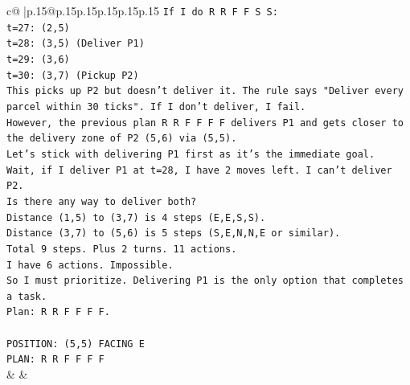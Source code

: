 \documentclass{article}
\begin{document}
{\begin{supertabular}{c@{$\;$}|p{.15\linewidth}@{}p{.15\linewidth}p{.15\linewidth}p{.15\linewidth}p{.15\linewidth}p{.15\linewidth}}
{{{\texttt{If I do R R F F S S:} \\
\texttt{t=27: (2,5)} \\
\texttt{t=28: (3,5) (Deliver P1)} \\
\texttt{t=29: (3,6)} \\
\texttt{t=30: (3,7) (Pickup P2)} \\
\texttt{This picks up P2 but doesn't deliver it. The rule says "Deliver every parcel within 30 ticks". If I don't deliver, I fail.} \\
\texttt{However, the previous plan R R F F F F delivers P1 and gets closer to the delivery zone of P2 (5,6) via (5,5).} \\
\texttt{Let's stick with delivering P1 first as it's the immediate goal.} \\
\texttt{Wait, if I deliver P1 at t=28, I have 2 moves left. I can't deliver P2.} \\
\texttt{Is there any way to deliver both?} \\
\texttt{Distance (1,5) to (3,7) is 4 steps (E,E,S,S).} \\
\texttt{Distance (3,7) to (5,6) is 5 steps (S,E,N,N,E or similar).} \\
\texttt{Total 9 steps. Plus 2 turns. 11 actions.} \\
\texttt{I have 6 actions. Impossible.} \\
\texttt{So I must prioritize. Delivering P1 is the only option that completes a task.} \\
\texttt{Plan: R R F F F F.} \\
\\ 
\texttt{POSITION: (5,5) FACING E} \\
\texttt{PLAN: R R F F F F} \\
            }
        }
    }
    & & \\ \\


\end{supertabular}}
\end{document}
